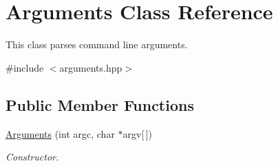 \hypertarget{classArguments}{}\section{Arguments Class Reference}
\label{classArguments}


This class parses command line arguments.  




{\ttfamily \#include $<$arguments.\+hpp$>$}

\subsection*{Public Member Functions}
\begin{DoxyCompactItemize}
\item 
\hyperlink{classArguments_a3d9dd7b675eac3c375c6b2e9bb13e896}{Arguments} (int argc, char $\ast$argv\mbox{[}$\,$\mbox{]})
\begin{DoxyCompactList}\small\item\em Constructor. \end{DoxyCompactList}\end{DoxyCompactItemize}
